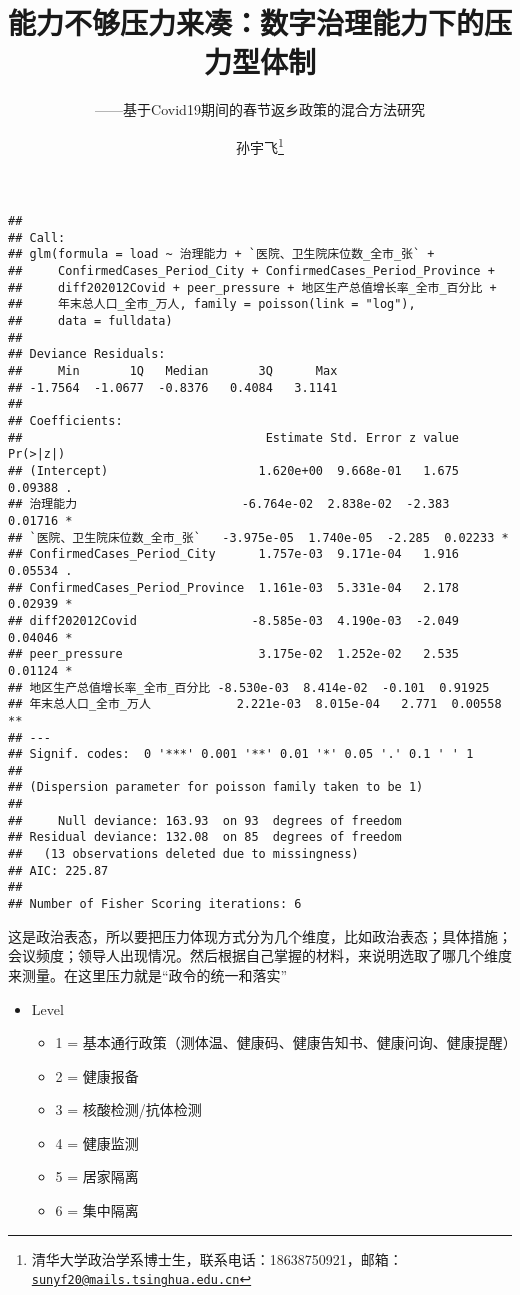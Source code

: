 \documentclass[
  12pt,
]{ctexart}
\title{能力不够压力来凑：数字治理能力下的压力型体制}
\subtitle{------基于Covid19期间的春节返乡政策的混合方法研究}
\author{孙宇飞\footnote{清华大学政治学系博士生，联系电话：18638750921，邮箱：\href{mailto:sunyf20@mails.tsinghua.edu.cn}{\nolinkurl{sunyf20@mails.tsinghua.edu.cn}}}}
\date{}
\providecommand{\tightlist}{%
  \setlength{\itemsep}{0pt}\setlength{\parskip}{0pt}}
\begin{document}
\maketitle

\begin{verbatim}
## 
## Call:
## glm(formula = load ~ 治理能力 + `医院、卫生院床位数_全市_张` + 
##     ConfirmedCases_Period_City + ConfirmedCases_Period_Province + 
##     diff202012Covid + peer_pressure + 地区生产总值增长率_全市_百分比 + 
##     年末总人口_全市_万人, family = poisson(link = "log"), 
##     data = fulldata)
## 
## Deviance Residuals: 
##     Min       1Q   Median       3Q      Max  
## -1.7564  -1.0677  -0.8376   0.4084   3.1141  
## 
## Coefficients:
##                                  Estimate Std. Error z value Pr(>|z|)   
## (Intercept)                     1.620e+00  9.668e-01   1.675  0.09388 . 
## 治理能力                       -6.764e-02  2.838e-02  -2.383  0.01716 * 
## `医院、卫生院床位数_全市_张`   -3.975e-05  1.740e-05  -2.285  0.02233 * 
## ConfirmedCases_Period_City      1.757e-03  9.171e-04   1.916  0.05534 . 
## ConfirmedCases_Period_Province  1.161e-03  5.331e-04   2.178  0.02939 * 
## diff202012Covid                -8.585e-03  4.190e-03  -2.049  0.04046 * 
## peer_pressure                   3.175e-02  1.252e-02   2.535  0.01124 * 
## 地区生产总值增长率_全市_百分比 -8.530e-03  8.414e-02  -0.101  0.91925   
## 年末总人口_全市_万人            2.221e-03  8.015e-04   2.771  0.00558 **
## ---
## Signif. codes:  0 '***' 0.001 '**' 0.01 '*' 0.05 '.' 0.1 ' ' 1
## 
## (Dispersion parameter for poisson family taken to be 1)
## 
##     Null deviance: 163.93  on 93  degrees of freedom
## Residual deviance: 132.08  on 85  degrees of freedom
##   (13 observations deleted due to missingness)
## AIC: 225.87
## 
## Number of Fisher Scoring iterations: 6
\end{verbatim}

这是政治表态，所以要把压力体现方式分为几个维度，比如政治表态；具体措施；会议频度；领导人出现情况。然后根据自己掌握的材料，来说明选取了哪几个维度来测量。在这里压力就是``政令的统一和落实''

\begin{itemize}
\tightlist
\item
  Level

  \begin{itemize}
  \tightlist
  \item
    1 = 基本通行政策（测体温、健康码、健康告知书、健康问询、健康提醒）
  \item
    2 = 健康报备
  \item
    3 = 核酸检测/抗体检测
  \item
    4 = 健康监测
  \item
    5 = 居家隔离
  \item
    6 = 集中隔离
  \end{itemize}
\end{itemize}
\end{document}
